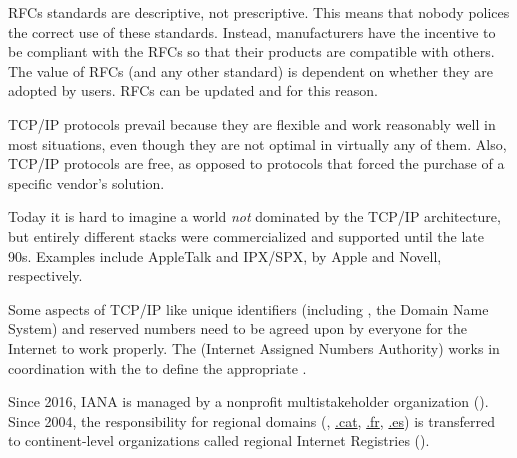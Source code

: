 RFCs standards are descriptive, not prescriptive. This means that nobody polices the correct 
use of these standards. Instead, manufacturers have the incentive to be compliant with the RFCs 
so that their products are compatible with others. 
% 
The value of RFCs (and any other standard) is dependent on whether
they are adopted by users. RFCs can be updated and  for this reason.

TCP/IP protocols prevail because they are flexible and work reasonably well in most situations, 
even though they are not optimal in virtually any of them. 
Also, TCP/IP protocols are free, as opposed to  protocols
that forced the purchase of a specific vendor's solution.
% 
\begin{remark}
Today it is hard to imagine a world \textit{not} 
dominated by the TCP/IP architecture, 
but entirely different stacks were commercialized and supported until the late 90s.
Examples include AppleTalk and IPX/SPX, by Apple and Novell, respectively.
\end{remark}


Some aspects of TCP/IP like unique identifiers 
(including , the Domain Name System)
and reserved numbers need to be agreed upon by everyone for the Internet to work properly.
% 
The  (Internet Assigned Numbers Authority) works in coordination with the 
to define the appropriate .

\begin{remark}
Since 2016, IANA is managed by a nonprofit multistakeholder organization 
().
% 
Since 2004, the responsibility for regional domains 
(\eg, \url{.cat}, \url{.fr}, \url{.es}) is transferred to continent-level 
organizations called regional Internet Registries ().
\end{remark}






